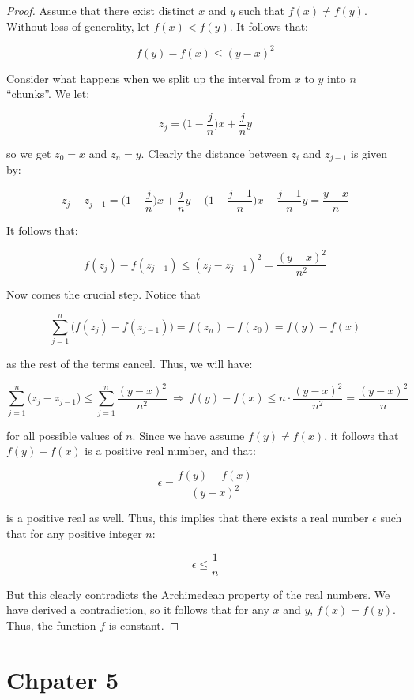 \documentclass[10pt, oneside]{article}
\begin{document}
    \begin{proof}
      Assume that there exist distinct $x$ and $y$ such that $f(x) \neq f(y)$. Without loss of generality, let $f(x) < f(y)$. It follows that:

      $$f(y) - f(x) \leq (y - x)^2$$

      Consider what happens when we split up the interval from $x$ to $y$ into $n$ ``chunks''. We let:

      $$z_j = \Big(1 - \frac{j}{n} \Big) x + \frac{j}{n} y$$

      so we get $z_0 = x$ and $z_n = y$. Clearly the distance between $z_i$ and $z_{j - 1}$ is given by:

      $$z_{j} - z_{j - 1} = \Big(1 - \frac{j}{n} \Big) x + \frac{j}{n} y - \Big(1 - \frac{j - 1}{n} \Big) x - \frac{j - 1}{n} y = \frac{y - x}{n}$$

      It follows that:

      $$f(z_{j}) - f(z_{j - 1}) \leq (z_{j} - z_{j - 1})^2 =  \frac{(y - x)^2}{n^2}$$

      Now comes the crucial step. Notice that

      $$\displaystyle\sum_{j = 1}^{n} \big( f(z_{j}) - f(z_{j - 1}) \big) = f(z_{n}) - f(z_{0}) = f(y) - f(x)$$

      as the rest of the terms cancel. Thus, we will have:

      $$\displaystyle\sum_{j = 1}^{n} \big( z_{j} - z_{j - 1} \big) \leq \displaystyle\sum_{j = 1}^{n}
      \frac{(y - x)^2}{n^2} \ \Rightarrow \  f(y) - f(x) \leq n \cdot \frac{(y - x)^2}{n^2} = \frac{(y - x)^2}{n}$$

      for all possible values of $n$. Since we have assume $f(y) \neq f(x)$, it follows that $f(y) - f(x)$ is a positive real number, and that:

      $$\epsilon = \frac{f(y) - f(x)}{(y - x)^2}$$

      is a positive real as well. Thus, this implies that there exists a real number $\epsilon$ such that for any positive integer $n$:

      $$\epsilon \leq \frac{1}{n}$$

      But this clearly contradicts the Archimedean property of the real numbers. We have derived a contradiction, so it follows that for any $x$ and $y$, $f(x) = f(y)$. Thus,
      the function $f$ is constant.

    \end{proof}

    \section{Chpater 5}
\end{document}
